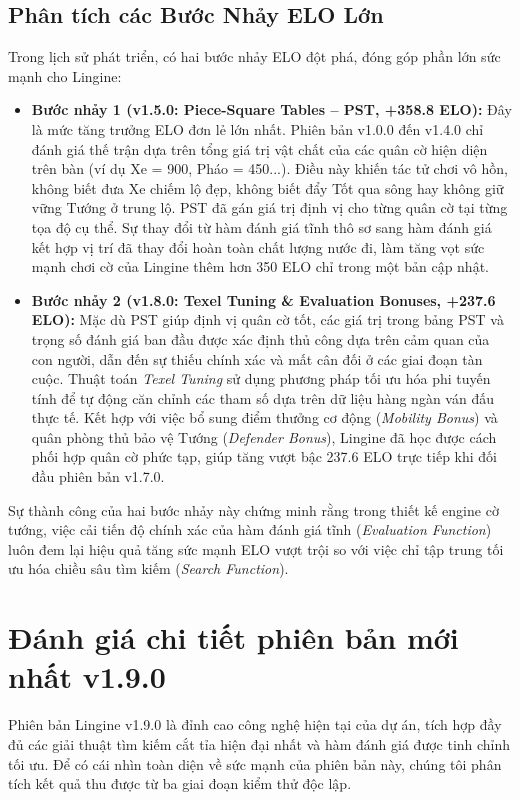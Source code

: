 \subsection{Phân tích các Bước Nhảy ELO Lớn}

Trong lịch sử phát triển, có hai bước nhảy ELO đột phá, đóng góp phần lớn sức mạnh cho Lingine:
\begin{itemize}
    \item \textbf{Bước nhảy 1 (v1.5.0: Piece-Square Tables -- PST, +358.8 ELO):} Đây là mức tăng trưởng ELO đơn lẻ lớn nhất. Phiên bản v1.0.0 đến v1.4.0 chỉ đánh giá thế trận dựa trên tổng giá trị vật chất của các quân cờ hiện diện trên bàn (ví dụ Xe = 900, Pháo = 450...). Điều này khiến tác tử chơi vô hồn, không biết đưa Xe chiếm lộ đẹp, không biết đẩy Tốt qua sông hay không giữ vững Tướng ở trung lộ. PST đã gán giá trị định vị cho từng quân cờ tại từng tọa độ cụ thể. Sự thay đổi từ hàm đánh giá tĩnh thô sơ sang hàm đánh giá kết hợp vị trí đã thay đổi hoàn toàn chất lượng nước đi, làm tăng vọt sức mạnh chơi cờ của Lingine thêm hơn 350 ELO chỉ trong một bản cập nhật.
    \item \textbf{Bước nhảy 2 (v1.8.0: Texel Tuning \& Evaluation Bonuses, +237.6 ELO):} Mặc dù PST giúp định vị quân cờ tốt, các giá trị trong bảng PST và trọng số đánh giá ban đầu được xác định thủ công dựa trên cảm quan của con người, dẫn đến sự thiếu chính xác và mất cân đối ở các giai đoạn tàn cuộc. Thuật toán \textit{Texel Tuning} sử dụng phương pháp tối ưu hóa phi tuyến tính để tự động căn chỉnh các tham số dựa trên dữ liệu hàng ngàn ván đấu thực tế. Kết hợp với việc bổ sung điểm thưởng cơ động (\textit{Mobility Bonus}) và quân phòng thủ bảo vệ Tướng (\textit{Defender Bonus}), Lingine đã học được cách phối hợp quân cờ phức tạp, giúp tăng vượt bậc 237.6 ELO trực tiếp khi đối đầu phiên bản v1.7.0.
\end{itemize}

Sự thành công của hai bước nhảy này chứng minh rằng trong thiết kế engine cờ tướng, việc cải tiến độ chính xác của hàm đánh giá tĩnh (\textit{Evaluation Function}) luôn đem lại hiệu quả tăng sức mạnh ELO vượt trội so với việc chỉ tập trung tối ưu hóa chiều sâu tìm kiếm (\textit{Search Function}).

\section{Đánh giá chi tiết phiên bản mới nhất v1.9.0}

Phiên bản Lingine v1.9.0 là đỉnh cao công nghệ hiện tại của dự án, tích hợp đầy đủ các giải thuật tìm kiếm cắt tỉa hiện đại nhất và hàm đánh giá được tinh chỉnh tối ưu. Để có cái nhìn toàn diện về sức mạnh của phiên bản này, chúng tôi phân tích kết quả thu được từ ba giai đoạn kiểm thử độc lập.

